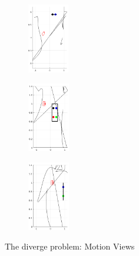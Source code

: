 \documentclass[a4paper,12pt]{article}
\begin{document}
\begin{figure}[tb!]
         \begin{subfigure}[b]{0.32\textwidth}
                \centering
                \includegraphics[height=1.2in]{../results/demo6-XY.png}
                 \end{subfigure}
         \begin{subfigure}[b]{0.2\textwidth}
                \centering
                \includegraphics[height=1.2in]{../results/demo6-XZ.png}
                 \end{subfigure}%
         \begin{subfigure}[b]{0.32\textwidth}
                \centering
                \includegraphics[height=1.2in]{../results/demo6-YZ.png}
                 \end{subfigure}%
         \caption{The diverge problem: Motion Views} 
        \label{fig:vdemo6} 
\end{figure}
\end{document}

